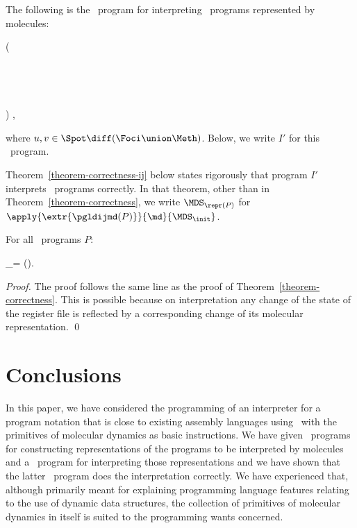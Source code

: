 \documentclass[fleqn]{llncs}
\begin{document}
The following is the \PGA\ program for interpreting \PGLDij\ programs
represented by molecules:
\begin{ldispl}
\begin{aeqns}
( \conc \halt \conc
{} \\ \phantom{(}
  \conc {} \conc
{} \\ \phantom{(}
  \conc {} \conc
{} \\ \phantom{(}
  \conc {} \conc
  \conc {} \conc
   \conc {} \conc
   \conc {} \conc
{} \\ \phantom{(}
  \conc {} \conc
  \conc
  \conc {} \conc
{} \\ \phantom{(}
 ) \rep\;,
\end{aeqns}
\end{ldispl}
where $u,v \in \Spot \diff (\Foci \union \Meth)$.
Below, we write $I'$ for this \PGA\ program.

Theorem~\ref{theorem-correctness-ij} below states rigorously that
program $I'$ interprets \PGLDij\ programs correctly.
In that theorem, other than in Theorem~\ref{theorem-correctness}, we
write $\MDS_{\repr(P)}$ for
$\apply{\extr{\pgldijmd(P)}}{\md}{\MDS_\init}$.
\begin{theorem}
\label{theorem-correctness-ij}
For all \PGLDij\ programs $P$:
\begin{ldispl}
_\sPGLDij =
\abstr()\;.
\end{ldispl}
\end{theorem}
\begin{proof}
The proof follows the same line as the proof of
Theorem~\ref{theorem-correctness}.
This is possible because on interpretation any change of the state of
the register file is reflected by a corresponding change of its
molecular representation.
\qed
\end{proof}

\section{Conclusions}
\label{sect-concl}

In this paper, we have considered the programming of an interpreter for
a program notation that is close to existing assembly languages using
\PGA\ with the primitives of molecular dynamics as basic instructions.
We have given \PGA\ programs for constructing representations of the
programs to be interpreted by molecules and a \PGA\ program for
interpreting those representations and we have shown that the latter
\PGA\ program does the interpretation correctly.
We have experienced that, although primarily meant for explaining
programming language features relating to the use of dynamic data
structures, the collection of primitives of molecular dynamics in itself
is suited to the programming wants concerned.
\end{document}

